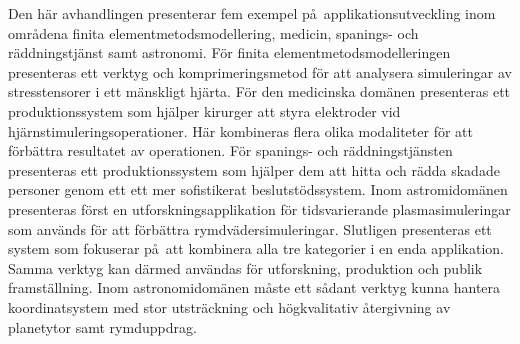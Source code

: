 Den h\"ar avhandlingen presenterar fem exempel p\aa\ applikationsutveckling inom omr\aa dena finita elementmetodsmodellering, medicin, spanings- och r\"addningstj\"anst samt astronomi.  F\"or finita elementmetodsmodelleringen presenteras ett verktyg och komprimeringsmetod  f\"or att analysera simuleringar av stresstensorer i ett m\"anskligt hj\"arta.  F\"or den medicinska dom\"anen presenteras ett produktionssystem som hj\"alper kirurger att styra elektroder vid hj\"arnstimuleringsoperationer.  H\"ar kombineras flera olika modaliteter f\"or att f\"orb\"attra resultatet av operationen.  F\"or spanings- och r\"addningstj\"ansten presenteras ett produktionssystem som hj\"alper dem att hitta och r\"adda skadade personer genom ett ett mer sofistikerat beslutst\"odssystem.  Inom astromidom\"anen presenteras f\"orst en utforskningsapplikation f\"or tidsvarierande plasmasimuleringar som anv\"ands f\"or att f\"orb\"attra rymdv\"adersimuleringar.  Slutligen presenteras ett system som fokuserar p\aa\ att kombinera alla tre kategorier i en enda applikation.  Samma verktyg kan d\"armed anv\"andas f\"or utforskning, produktion och publik framst\"allning.  Inom astronomidom\"anen m\aa ste ett s\aa dant verktyg kunna hantera koordinatsystem med stor utstr\"ackning och h\"ogkvalitativ \aa tergivning av planetytor samt rymduppdrag.
